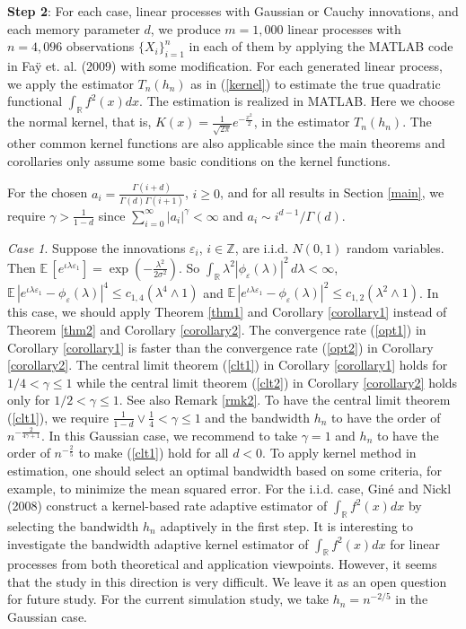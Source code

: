 \documentclass[11pt]{article}
\def\R{{\mathbb R}}
\def\E{{{\mathbb E}\,}}
\begin{document}
{\bf Step 2}: For each case, linear processes with Gaussian or Cauchy innovations, and each memory parameter $d$, we produce $m=1,000$ linear processes with $n=4,096$ observations $\{X_i\}_{i=1}^n$ in each of them by applying the MATLAB code in Fa\"{y} et. al. (2009) with some modification.  For each generated linear process, we apply the estimator $T_n(h_n)$ as in (\ref{kernel}) to estimate the true quadratic functional $\int_\mathbb{R} f^2(x) dx$. The estimation is realized in MATLAB. Here we choose the normal kernel, that is, $K(x)=\frac{1}{\sqrt{2\pi}}e^{-\frac{x^2}{2}}$, in the estimator $T_n(h_n)$. The other common kernel functions are also applicable since the main theorems and corollaries only assume  some basic conditions on the kernel functions. 

 For the chosen  $a_i=\frac{\Gamma(i+d)}{\Gamma(d)\Gamma(i+1)}$, $i\ge 0$, and for all results in Section \ref{main},  we require $\gamma>\frac{1}{1-d}$ since $\sum_{i=0}^\infty |a_i|^\gamma<\infty$ and $a_i\sim i^{d-1}/\Gamma(d)$.
 
 {\it Case 1}. Suppose the innovations $\varepsilon_i$, $i\in\mathbb{Z}$, are i.i.d. $N(0,1)$ random variables. Then $\E[e^{\iota\lambda \varepsilon_1}]=\exp(-\frac{\lambda^2}{2\sigma^2})$. So $\int_{\R}\lambda^2 |\phi_{\varepsilon}(\lambda)|^2\, d\lambda<\infty$, $\E|e^{\iota \lambda \varepsilon_1}-\phi_{\varepsilon}(\lambda)|^{4}\leq c_{1,4} \left(\lambda^4\wedge 1\right)$ and $\E|e^{\iota \lambda \varepsilon_1}-\phi_{\varepsilon}(\lambda)|^{2}\leq c_{1,2} \left(\lambda^{2}\wedge 1\right)$. 
 In this case, we should apply Theorem \ref{thm1} and Corollary \ref{corollary1} instead of Theorem \ref{thm2} and Corollary \ref{corollary2}. 
 The convergence rate (\ref{opt1}) in Corollary \ref{corollary1} is faster than the convergence rate (\ref{opt2}) in Corollary \ref{corollary2}. The central limit theorem (\ref{clt1}) in Corollary \ref{corollary1} holds for $1/4<\gamma \le 1$ while the central limit theorem (\ref{clt2}) in Corollary \ref{corollary2} holds only  for $1/2<\gamma \le 1$. See also Remark \ref{rmk2}. To have the central limit theorem (\ref{clt1}), we require $\frac{1}{1-d}\vee \frac{1}{4}<\gamma\le 1$ and the bandwidth  $h_n$ to have the order of $n^{-\frac{2}{4\gamma+1}}$. In this Gaussian case, we recommend to take $\gamma=1$ and $h_n$ to have the order of $n^{-\frac{2}{5}}$ to make (\ref{clt1}) hold for all $d<0$. To apply kernel method in estimation, one should select an optimal bandwidth based on some criteria, for example, to minimize the mean squared error. For the i.i.d. case, Gin\'{e} and Nickl (2008) construct a kernel-based rate adaptive estimator of $\int_\mathbb{R}f^2(x)dx$ by selecting the bandwidth $h_n$ adaptively in the first step. It is interesting to investigate the bandwidth adaptive kernel estimator of  $\int_\mathbb{R}f^2(x)dx$ for linear processes from both theoretical and application viewpoints. However, it seems that the study in this direction is very difficult. We leave it as an open question for future study. For the current simulation study, we take $h_n=n^{-2/5}$ in the Gaussian case. 
 
\end{document}
